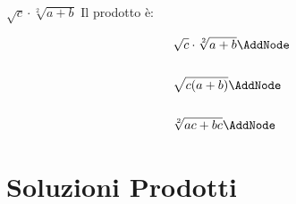 \begin{exercise}
	$\sqrt{c}\cdot\sqrt[2]{a+b}$
	\tcblower
	Il prodotto è:
	\begin{NodesList}
		\begin{align*}
		&\sqrt{c}\cdot\sqrt[2]{a+b} \AddNode\\
		&\\
		&\sqrt{c(a+b)} \AddNode\\
		&\\
		&\sqrt[2]{ac+bc} \AddNode\\
		\end{align*}
				
			\end{NodesList}
		\end{exercise}					

\tcbstoprecording
\newpage
\section{Soluzioni Prodotti}
\tcbinputrecords
\newpage
